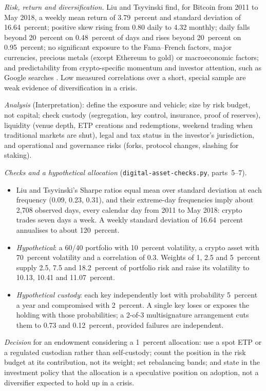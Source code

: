 \begin{qfmethod}
\emph{Risk, return and diversification.} Liu and Tsyvinski find, for Bitcoin from 2011 to May 2018, a weekly mean return of 3.79~percent and standard deviation of 16.64~percent; positive skew rising from 0.80 daily to 4.32 monthly; daily falls beyond 20~percent on 0.48~percent of days and rises beyond 20~percent on 0.95~percent; no significant exposure to the Fama--French factors, major currencies, precious metals (except Ethereum to gold) or macroeconomic factors; and predictability from crypto-specific momentum and investor attention, such as Google searches \citep[NBER WP 24877, August 2018, pp.~1--2 and Table~1, pp.~6--7]{roadmap-crypto-risks-returns}. Low measured correlations over a short, special sample are weak evidence of diversification in a crisis.

\emph{Analysis} (Interpretation): define the exposure and vehicle; size by risk budget, not capital; check custody (segregation, key control, insurance, proof of reserves), liquidity (venue depth, ETP creations and redemptions, weekend trading when traditional markets are shut), legal and tax status in the investor's jurisdiction, and operational and governance risks (forks, protocol changes, slashing for staking).

 \emph{Checks and a hypothetical allocation} (\texttt{digital-asset-checks.py}, parts~5--7).
\begin{itemize}
\item Liu and Tsyvinski's Sharpe ratios equal mean over standard deviation at each frequency (0.09, 0.23, 0.31), and their extreme-day frequencies imply about 2{,}708 observed days, every calendar day from 2011 to May 2018: crypto trades seven days a week. A weekly standard deviation of 16.64~percent annualises to about 120~percent.
\item \emph{Hypothetical}: a 60/40 portfolio with 10~percent volatility, a crypto asset with 70~percent volatility and a correlation of 0.3. Weights of 1, 2.5 and 5~percent supply 2.5, 7.5 and 18.2~percent of portfolio risk and raise its volatility to 10.13, 10.41 and 11.07~percent.
\item \emph{Hypothetical custody}: each key independently lost with probability 5~percent a year and compromised with 2~percent. A single key loses or exposes the holding with those probabilities; a 2-of-3 multisignature arrangement cuts them to 0.73 and 0.12~percent, provided failures are independent.
\end{itemize}
\emph{Decision} for an endowment considering a 1~percent allocation: use a spot ETP or a regulated custodian rather than self-custody; count the position in the risk budget at its contribution, not its weight; set rebalancing bands; and state in the investment policy that the allocation is a speculative position on adoption, not a diversifier expected to hold up in a crisis.


\end{qfmethod}
